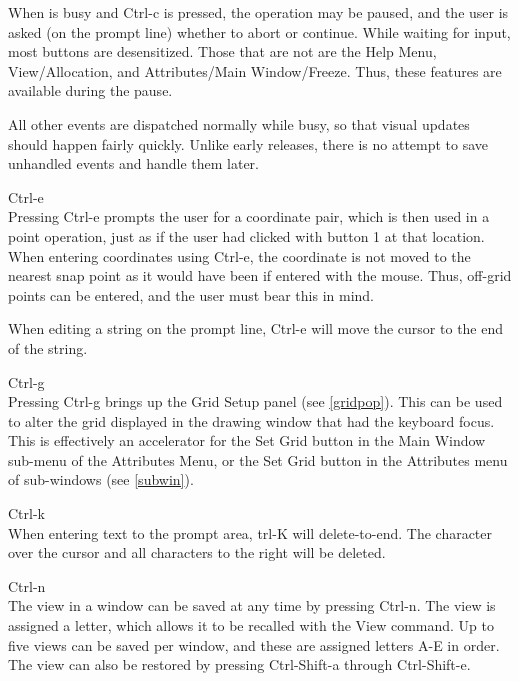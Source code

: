 \begin{description}
When {\Xic} is busy and {\kb Ctrl-c} is pressed, the operation may be
paused, and the user is asked (on the prompt line) whether to abort or
continue.  While waiting for input, most buttons are desensitized. 
Those that are not are the {\cb Help Menu}, {\cb View/Allocation}, and
{\cb Attributes/Main Window/Freeze}.  Thus, these features are
available during the pause.

All other events are dispatched normally while busy, so that
visual updates should happen fairly quickly.  Unlike early
releases, there is no attempt to save unhandled events and handle
them later.

\item{\kb Ctrl-e}\\
Pressing {\kb Ctrl-e} prompts the user for a coordinate pair, which is
then used in a point operation, just as if the user had clicked with
button 1 at that location.  When entering coordinates using {\kb
Ctrl-e}, the coordinate is not moved to the nearest snap point as it
would have been if entered with the mouse.  Thus, off-grid points can
be entered, and the user must bear this in mind.

When editing a string on the prompt line, {\kb Ctrl-e} will move the
cursor to the end of the string. 

\item{\kb Ctrl-g}\\
Pressing {\kb Ctrl-g} brings up the {\cb Grid Setup} panel (see
\ref{gridpop}).  This can be used to alter the grid displayed in the
drawing window that had the keyboard focus.  This is effectively an
accelerator for the {\cb Set Grid} button in the {\cb Main Window}
sub-menu of the {\cb Attributes Menu}, or the {\cb Set Grid} button
in the {\cb Attributes} menu of sub-windows (see \ref{subwin}).

\item{\kb Ctrl-k}\\
When entering text to the prompt area, {\kb trl-K} will delete-to-end. 
The character over the cursor and all characters to the right will be
deleted.

\item{\kb Ctrl-n}\\
The view in a window can be saved at any time by pressing {\kb
Ctrl-n}.  The view is assigned a letter, which allows it to be
recalled with the {\cb View} command.  Up to five views can be saved
per window, and these are assigned letters A-E in order.  The view can
also be restored by pressing {\kb Ctrl-Shift-a} through {\kb
Ctrl-Shift-e}.


\end{description}
